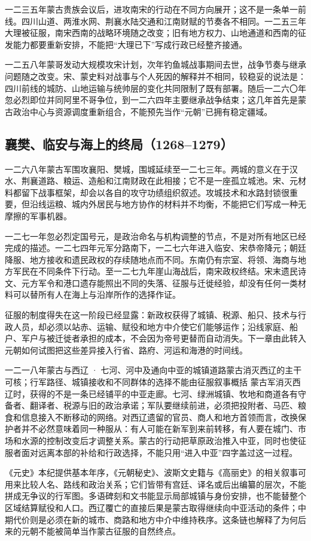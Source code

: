 一二三五年蒙古贵族会议后，进攻南宋的行动在不同方向展开；这不是一条单一前线。四川山道、两淮水网、荆襄水陆交通和江南财赋的节奏各不相同。一二五三年大理被征服，南宋西南的战略环境随之改变；旧有地方权力、山地通道和西南的征发能力都要重新安排，不能把“大理已下”写成行政已经整齐接通。

一二五八年蒙哥发动大规模攻宋计划，次年钓鱼城战事期间去世，战争节奏与继承问题随之改变。宋、蒙史料对战事与个人死因的解释并不相同，较稳妥的说法是：四川前线的城防、山地运输与统帅层的变化共同限制了既有部署。随后一二六〇年忽必烈即位并同阿里不哥争位，到一二六四年主要继承战争结束；这几年首先是蒙古政治中心与资源调度重新组合，不能预先当作“元朝”已拥有稳定疆域。

\subsection{襄樊、临安与海上的终局（1268--1279）}

\label{evt:mongol-yuan-xiangfan}
一二六八年蒙古军围攻襄阳、樊城，围城延续至一二七三年。两城的意义在于汉水、荆襄道路、粮运、造船和江南财政在此相接；它不是一座孤立城池。宋、元材料都留下战事框架，却会以各自的攻守功绩组织叙述。攻城技术和水路封锁很重要，但沿线运粮、城内外居民与地方协作的材料并不均衡，不能把它们写成一种无摩擦的军事机器。

一二七一年忽必烈定国号元，是政治命名与机构调整的节点，不是对所有地区已经完成的描述。一二七四年元军分路南下，一二七六年进入临安、宋恭帝降元；朝廷降服、地方接收和遗民政权的存续随地点而不同。东南仍有宗室、将领、海商与地方军民在不同条件下行动。至一二七九年崖山海战后，南宋政权终结。宋末遗民诗文、元方军令和港口遗存能照出不同的失落、征服与迁徙经验，却没有任何一类材料可以替所有人在海上与沿岸所作的选择作证。

征服的制度得失在这一阶段已经显露：新政权获得了城镇、税源、船只、技术与行政人员，却必须以站赤、运输、赋役和地方中介使它们能够运作；沿线家庭、船户、军户与被迁徙者承担的成本，不会因为帝号更替而自动消失。下一章由此转入元朝如何试图把这些差异接入行省、路府、河运和海港的时间线。


\begin{event}{}{一二一八年}{蒙古与西辽 · 七河、河中及通向中亚的城镇道路}{蒙古消灭西辽的主干可核；行军路径、城镇接收和不同群体的选择不能由征服叙事概括}
蒙古军消灭西辽时，获得的不是一条已经铺平的中亚走廊。七河、绿洲城镇、牧地和商道各有守备者、翻译者、税源与旧的政治承诺；军队要继续前进，必须把投附者、马匹、粮食和信息接入不断移动的网络。对西辽遗留的官员、商人和地方首领而言，改换保护者并不必然意味着同一种服从：有人可能在新军到来前转移，有人要在城门、市场和水源的控制改变后才调整关系。蒙古的行动把草原政治推入中亚，同时也使征服者面对远离本部的补给和行政选择，不能只用“进入中亚”四字盖过这一过程。

《元史》本纪提供基本年序，《元朝秘史》、波斯文史籍与《高丽史》的相关叙事可用来比较人名、路线和政治关系；它们皆带有宫廷、译名或后出编纂的层次，不能拼成无争议的行军图。多语碑刻和文书能显示局部城镇与身份安排，也不能替整个区域结算赋役和人口。西辽覆亡的直接后果是蒙古取得继续向中亚活动的条件；中期代价则是必须在新的城市、商路和地方中介中维持秩序。这条链也解释了为何后来的元朝不能被简单当作蒙古征服的自然终点。
\end{event}

